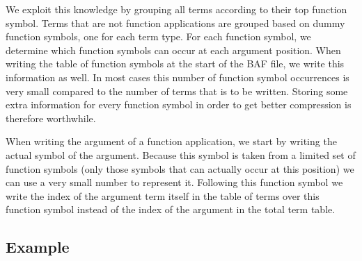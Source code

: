 \documentclass{article}
\begin{document}
We exploit this knowledge by grouping all terms according to their top function symbol.
Terms that are not function applications are grouped based on dummy function symbols,
one for each term type. For each function symbol, we determine which function symbols can occur
at each argument position. When writing the table of function symbols at the start of the BAF file,
we write this information as well. In most cases this number of function symbol occurrences is very small compared
to the number of terms that is to be written. Storing some extra information for every function symbol in order
to get better compression is therefore worthwhile.

When writing the argument of a function application, we start by writing the actual symbol of the argument.
Because this symbol is taken from a limited set of function symbols (only those symbols that can actually occur at
this position) we can use a very small number to represent it. Following this function symbol we write the
index of the argument term itself in the table of terms over this function symbol instead of the index of
the argument in the total term table.

\subsection{Example}
\end{document}
